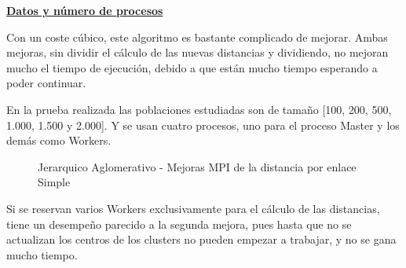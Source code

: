 			\begin{flushleft}
				\begin{mdframed}[roundcorner=5pt]			
					\textbf{\underline{Datos y número de procesos}}
					\vspace{0.1cm}
					
					\scriptsize	
					Con un coste cúbico, este algoritmo es bastante complicado de mejorar. Ambas mejoras, sin dividir el cálculo de las nuevas distancias y dividiendo, no mejoran mucho el tiempo de ejecución, debido a que están mucho tiempo esperando a poder continuar. 
					
					En la prueba realizada las poblaciones estudiadas son de tamaño [100, 200, 500, 1.000, 1.500 y 2.000]. Y se usan cuatro procesos, uno para el proceso Master y los demás como Workers.
				\end{mdframed}
			\end{flushleft}	
			
			
		
			\begin{figure}[!h]
				\centering
				\caption{Jerarquico Aglomerativo - Mejoras MPI de la distancia por enlace Simple}
			\end{figure}
			\newpage
			Si se reservan varios Workers exclusivamente para el cálculo de las distancias, tiene un desempeño parecido a la segunda mejora, pues hasta que no se actualizan los centros de los clusters no pueden empezar a trabajar, y no se gana mucho tiempo.
				
